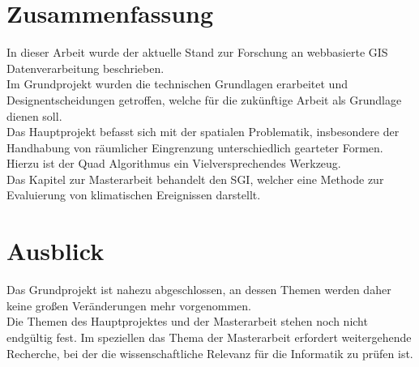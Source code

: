 \documentclass[10pt,conference,compsocconf]{IEEEtran}
\begin{document}
\section{Zusammenfassung}
In dieser Arbeit wurde der aktuelle Stand zur Forschung an webbasierte GIS Datenverarbeitung beschrieben.\\
Im Grundprojekt wurden die technischen Grundlagen erarbeitet und Designentscheidungen getroffen, welche für die zukünftige Arbeit als Grundlage dienen soll.\\
Das Hauptprojekt befasst sich mit der spatialen Problematik, insbesondere der Handhabung von räumlicher Eingrenzung unterschiedlich gearteter Formen. Hierzu ist der Quad Algorithmus ein Vielversprechendes Werkzeug.\\
Das Kapitel zur Masterarbeit behandelt den SGI, welcher eine Methode zur Evaluierung von klimatischen Ereignissen darstellt.



\section{Ausblick}
Das Grundprojekt ist nahezu abgeschlossen, an dessen Themen werden daher keine großen Veränderungen mehr vorgenommen. \\
Die Themen des Hauptprojektes und der Masterarbeit stehen noch nicht endgültig fest. Im speziellen das Thema der Masterarbeit erfordert weitergehende Recherche, bei der die wissenschaftliche Relevanz für die Informatik zu prüfen ist.




\end{document}
